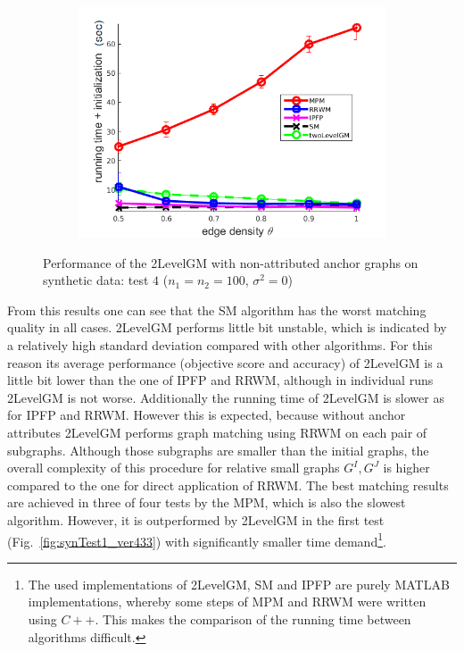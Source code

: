\begin{figure}
\begin{subfigure}[b]{0.33\textwidth}
			\includegraphics[scale=0.33]{"chapter3/fig/SyntheticTest/no_descr/Results_v4.3.3/Test4/time_summary_avg10t"} 
		\end{subfigure} 	
	\caption[Performance of the 2LevelGM with non-attributed anchor graphs on synthetic data (test $4$)]{Performance of the 2LevelGM with non-attributed anchor graphs on synthetic data: test $4$ ($n_1=n_2=100$, $\sigma^2=0$)}
	\label{fig:synTest4_ver433}
\end{figure}

From this results one can see that the SM algorithm has the worst matching quality in all cases. 2LevelGM performs little bit unstable, which is indicated by a relatively high standard deviation compared with other algorithms. For this reason its average performance (objective score and accuracy) of 2LevelGM is a little bit lower than the one of IPFP and RRWM, although in individual runs 2LevelGM is not worse. Additionally the running time of 2LevelGM is slower as for IPFP and RRWM. However this is expected, because without anchor attributes 2LevelGM performs graph matching using RRWM on each pair of subgraphs. Although those subgraphs are smaller than the initial graphs, the overall complexity of this procedure for relative small graphs $G^I,G^J$ is higher compared to the one for direct application of RRWM. The best matching results are achieved in three of four tests by the MPM, which is also the slowest algorithm. However, it is outperformed by 2LevelGM in the first test (Fig.~\ref{fig:synTest1_ver433}) with significantly smaller time demand\footnote{The used implementations of 2LevelGM, SM and IPFP are purely MATLAB implementations, whereby some steps of MPM and RRWM were written using $C++$. This makes the comparison of the running time between algorithms difficult.}.

